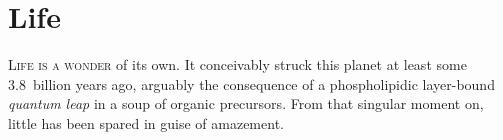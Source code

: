 \section{Life}

\textsc{Life is a wonder} of its own.  It conceivably struck this planet at
least some 3.8~billion years ago,\cite{mojzsis_evidence_1996} arguably the
consequence of a phospholipidic \mbox{layer-bound} \emph{quantum leap} in a soup
of organic precursors.\cite{miller_organic_1959} From that singular moment on,
little has been spared in guise of amazement.

\bigskip





